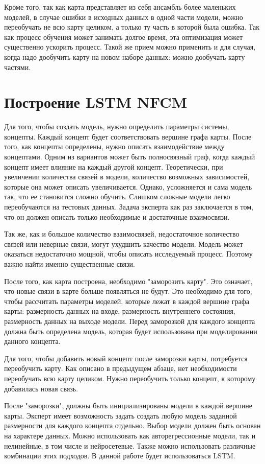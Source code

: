 Кроме того, так как карта представляет из себя ансамбль
более маленьких моделей, в случае ошибки в исходных данных
в одной части модели, можно переобучать не всю карту целиком,
а только ту часть в которой была ошибка. Так как процесс обучения
может занимать долгое время, эта оптимизация может существенно ускорить процесс.
Такой же прием можно применить и для случая, когда надо дообучить карту на
новом наборе данных: можно дообучать карту частями.

\section{Построение LSTM NFCM}

Для того, чтобы создать модель, нужно определить параметры системы, концепты.
Каждый концепт будет соответствовать вершине графа карты.
После того, как концепты определены, нужно описать взаимодействие между концептами.
Одним из вариантов может быть полносвязный граф, когда каждый концепт имеет
влияние на каждый другой концепт. Теоретически, при увеличении количества
связей в модели, количество возможных зависимостей, которые она может описать
увеличивается. Однако, усложняется и сама модель так, что ее становится сложно обучить.
Слишком сложные модели легко переобучаются на тестовых данных.
Задача эксперта как раз заключается в том, что он должен
описать только необходимые и достаточные взаимосвязи.

Так же, как и большое количество взаимосвязей,
недостаточное количество связей или неверные связи, могут ухудшить
качество модели. Модель может оказаться недостаточно мощной, чтобы описать
исследуемый процесс. Поэтому важно найти именно существенные связи.

После того, как карта построена, необходимо "заморозить карту".
Это означает, что новые связи в карте больше появляться не будут.
Это необходимо для того, чтобы рассчитать параметры моделей, которые
лежат в каждой вершине графа карты: размерность данных на входе,
размерность внутреннего состояния, размерность данных на выходе модели.
Перед заморозкой для каждого концепта должна быть определена модель,
которая будет использована при моделировании данного концепта.

Для того, чтобы добавить новый концепт после заморозки карты,
потребуется переобучить карту. Как описано в предыдущем абзаце,
нет необходимости переобучать всю карту целиком. Нужно переобучить только
концепт, к которому добавилась новая связь.

После "заморозки", должны быть инициализированы модели в каждой вершине
карты. Эксперт имеет возможность задать создать любую модель заданной размерности
для каждого концепта отдельно. Выбор модели должен быть основан
на характере данных. Можно использовать как авторегрессионные модели,
так и нелинейные, в том числе и нейросетевые. Также можно использовать различные комбинации
этих подходов. В данной работе будет использоваться LSTM.

